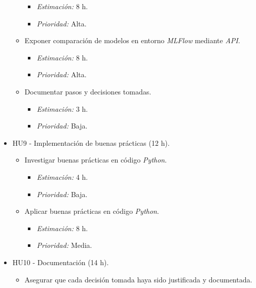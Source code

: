 \documentclass[
11pt, %
]{charter}
\begin{document}
\begin{itemize}
\begin{itemize}
                \begin{itemize}
                    \item \textit{Estimación:} 8 h.
                    \item \textit{Prioridad:} Alta.
                \end{itemize}
            \item Exponer comparación de modelos en entorno \textit{MLFlow} mediante \textit{API}.
                \begin{itemize}
                    \item \textit{Estimación:} 8 h.
                    \item \textit{Prioridad:} Alta.
                \end{itemize}
            \item Documentar pasos y decisiones tomadas.
                \begin{itemize}
                    \item \textit{Estimación:} 3 h.
                    \item \textit{Prioridad:} Baja.
                \end{itemize}
        \end{itemize}
    \item HU9 - Implementación de buenas prácticas (12 h).
        \begin{itemize}
            \item Investigar buenas prácticas en código \textit{Python}.
                \begin{itemize}
                    \item \textit{Estimación:} 4 h.
                    \item \textit{Prioridad:} Baja.
                \end{itemize}
            \item Aplicar buenas prácticas en código \textit{Python}.
                \begin{itemize}
                    \item \textit{Estimación:} 8 h.
                    \item \textit{Prioridad:} Media.
                \end{itemize}
        \end{itemize}
    \item HU10 - Documentación (14 h).
        \begin{itemize}
            \item Asegurar que cada decisión tomada haya sido justificada y documentada.

\end{itemize}
\end{itemize}
\end{document}

